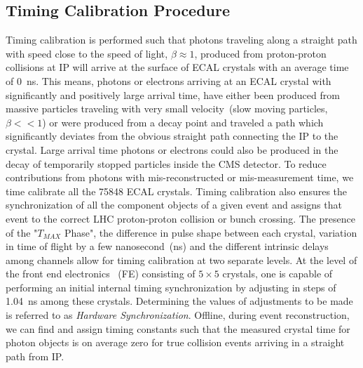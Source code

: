 \subsection{Timing Calibration Procedure}
Timing calibration is performed such that photons traveling along a straight path with speed close to the speed of light, $\beta \approx 1$, produced from proton-proton collisions at IP will arrive at the surface of ECAL crystals  with an average time of $0$~ns. This means, photons or electrons arriving at an ECAL crystal with significantly and positively large arrival time, have either been produced from massive particles traveling with very small velocity~(slow moving particles, $\beta << 1$) or were produced from a decay point and traveled a path which significantly deviates from the obvious straight path connecting the IP to the crystal.
Large arrival time photons or electrons could also be produced in the decay of temporarily stopped particles inside the CMS detector. To reduce contributions from photons with mis-reconstructed or mis-measurement time, we time calibrate all the 75848 ECAL \pb crystals.
Timing calibration also ensures the synchronization of all the component objects of a given event and assigns that event to the correct LHC proton-proton collision or bunch crossing.
The presence of the "$T_{MAX}$ Phase", the difference in pulse shape between each crystal, variation in time of flight by a few nanosecond~(ns) and the different intrinsic delays among channels allow for timing calibration at two separate levels.
At the level of the front end electronics ~(FE) consisting of $5\times5$ crystals, one is capable of performing an initial internal timing synchronization by adjusting in steps of 1.04~ns among these crystals. Determining the values of adjustments to be made is referred to as \textit{Hardware Synchronization}. Offline, during event reconstruction, we can find and assign timing constants such that the measured crystal time for photon objects is on average zero for true collision events arriving in a straight path from IP.

